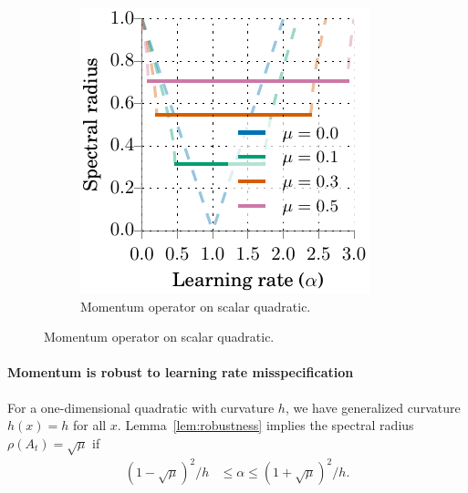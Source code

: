 \documentclass{article} %
\newcommand{\mat}[1]{\bm{\mathit{#1}}}
\begin{document}
\begin{figure}
\vspace{-1.25em}
\begin{minipage}{1.0\linewidth}
\begin{figure}[H]
  \includegraphics[width=0.975\linewidth]{figures/spectral_radii}
  \vspace{-0.75em}
\caption{
Momentum operator on scalar quadratic.
}
\label{fig:lr_robustness}
\end{figure}
\end{minipage}
\end{figure}
\vspace{-0.5em}
\paragraph{Momentum is robust to learning rate misspecification}
\label{sec:lr_robustness}
For a one-dimensional quadratic with curvature $h$,
we have generalized curvature $h(x)=h$ for all $x$. Lemma~\ref{lem:robustness} implies the spectral radius $\rho(\mat{A}_t)\!=\!\sqrt{\mu}$ if
\begin{align}
{(1-\sqrt{\mu})^2/h} &\leq \alpha \leq {(1+\sqrt{\mu})^2/h}.
\label{eqn:lr_robustness}
\end{align}
\end{document}
